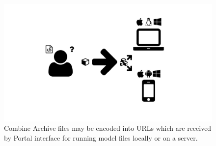 \begin{figure}
  \centering
  \includegraphics[width=\textwidth,page=14,trim=0.37cm .65cm 0.37cm 0.3cm, clip=true]{images/Figures.pdf}
  \caption{Combine Archive files may be encoded into URLs which are received by Portal interface for running model files locally or on a server.}
  \label{Figure:carbon-combine-archive}
\end{figure}




